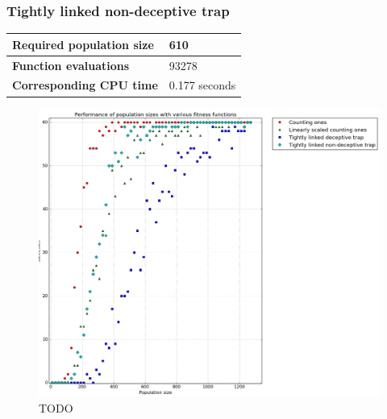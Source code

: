 \documentclass[12pt]{article}
\theoremstyle{definition}
\begin{document}
\subsubsection*{Tightly linked non-deceptive trap}
\begin{table}[H]
\begin{tabular}{|ll|}
\hline
\textbf{Required population size} & 610              \\ \hline
\textbf{Function evaluations}     & 93278            \\ \hline
\textbf{Corresponding CPU time}   & 0.177 seconds    \\ \hline
\end{tabular}
\end{table}


\begin{figure}[H]
    \centering
    \includegraphics[width=1\linewidth]{images/exp1.png}
    \caption{TODO}
\label{fig:exp1}
\end{figure}
\end{document}
